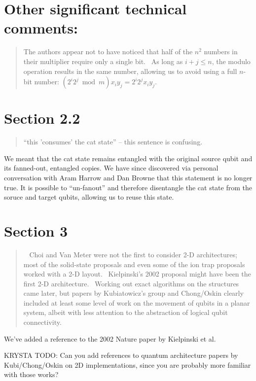 \documentclass{article}
\theoremstyle{plain} \newtheorem{lemma}{Lemma}
\begin{document}
\section{Other significant technical comments:}

\begin{quote}
The authors appear not to have noticed that half of the $n^2$ numbers in 
their multiplier require only a single bit.  As long as $i+j \le n$, the 
modulo operation results in the same number, allowing us to avoid 
using a full $n$-bit number: $(2^i 2^j \bmod m) x_i y_j = 2^i 2^j x_i y_j$. 
\end{quote}

\section{Section 2.2}

\begin{quote}
``this 'consumes' the cat state'' -- this sentence is confusing. 
\end{quote}

We meant that the cat state remains entangled with the original source
qubit and its fanned-out, entangled copies. We have since discovered
via personal conversation with Aram Harrow and Dan Browne that this
statement is no longer true. It is possible to ``un-fanout'' and therefore
disentangle the cat state from the soruce and target qubits, allowing us
to reuse this state.

\section{Section 3}

\begin{quote}
  Choi and Van Meter were not the first to consider 2-D architectures; 
most of the solid-state proposals and even some of the ion trap 
proposals worked with a 2-D layout.  Kielpinski's 2002 proposal might 
have been the first 2-D architecture.  Working out exact algorithms on 
the structures came later, but papers by Kubiatowicz's group and 
Chong/Oskin clearly included at least some level of work on the 
movement of qubits in a planar system, albeit with less attention to 
the abstraction of logical qubit connectivity. 
\end{quote}

We've added a reference to the 2002 Nature paper by Kielpinski et al.

KRYSTA TODO: Can you add references to quantum architecture papers by
Kubi/Chong/Oskin on 2D implementations, since you are probably more
familiar with those works?
\end{document}
